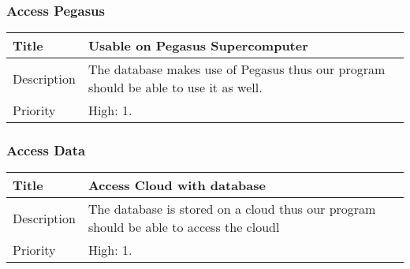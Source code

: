 \subsubsection{Access Pegasus}
  \begin{table}[h!]
    \begin{tabularx}{\textwidth}{|l|X|}
      \hline
      Title       & Usable on Pegasus Supercomputer \\ \hline
      Description & The database makes use of Pegasus thus our program should be
                    able to use it as well. \\ \hline
      Priority    & High: 1. \\ \hline
    \end{tabularx}
  \end{table}

\subsubsection{Access Data}
  \begin{table}[h!]
    \begin{tabularx}{\textwidth}{|l|X|}
      \hline
      Title        & Access Cloud with database \\ \hline
      Description  & The database is stored on a cloud thus our program should
                     be able to access the cloudl \\ \hline
      Priority     & High: 1. \\ \hline
    \end{tabularx}
  \end{table}
